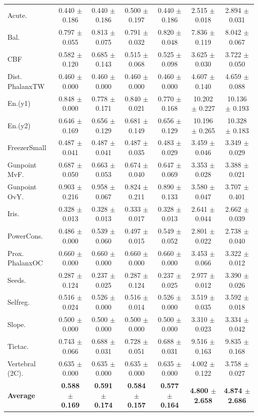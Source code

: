 \begin{table}[t]
{\begin{tabular}{lcccccc}
Acute. & 0.440 $\pm$ 0.186 & 0.440 $\pm$ 0.186 & 0.500 $\pm$ 0.197 & 0.440 $\pm$ 0.186 & 2.515 $\pm$ 0.018 & 2.894 $\pm$ 0.031 \\
Bal. & 0.797 $\pm$ 0.055 & 0.813 $\pm$ 0.075 & 0.791 $\pm$ 0.032 & 0.820 $\pm$ 0.048 & 7.836 $\pm$ 0.119 & 8.042 $\pm$ 0.067 \\
CBF & 0.582 $\pm$ 0.120 & 0.685 $\pm$ 0.143 & 0.515 $\pm$ 0.068 & 0.525 $\pm$ 0.098 & 3.625 $\pm$ 0.030 & 3.722 $\pm$ 0.050 \\
Dist. PhalanxTW & 0.460 $\pm$ 0.000 & 0.460 $\pm$ 0.000 & 0.460 $\pm$ 0.000 & 0.460 $\pm$ 0.000 & 4.607 $\pm$ 0.140 & 4.659 $\pm$ 0.088 \\
En.(y1) & 0.848 $\pm$ 0.000 & 0.778 $\pm$ 0.171 & 0.840 $\pm$ 0.021 & 0.770 $\pm$ 0.168 & 10.202 $\pm$ 0.227 & 10.136 $\pm$ 0.193 \\
En.(y2) & 0.646 $\pm$ 0.169 & 0.656 $\pm$ 0.129 & 0.681 $\pm$ 0.149 & 0.656 $\pm$ 0.129 & 10.196 $\pm$ 0.265 & 10.328 $\pm$ 0.183 \\
FreezerSmall & 0.487 $\pm$ 0.041 & 0.487 $\pm$ 0.041 & 0.487 $\pm$ 0.035 & 0.483 $\pm$ 0.029 & 3.459 $\pm$ 0.046 & 3.349 $\pm$ 0.029 \\
Gunpoint MvF. & 0.687 $\pm$ 0.050 & 0.663 $\pm$ 0.053 & 0.674 $\pm$ 0.040 & 0.647 $\pm$ 0.069 & 3.353 $\pm$ 0.028 & 3.388 $\pm$ 0.021 \\
Gunpoint OvY. & 0.903 $\pm$ 0.216 & 0.958 $\pm$ 0.067 & 0.824 $\pm$ 0.211 & 0.890 $\pm$ 0.133 & 3.580 $\pm$ 0.047 & 3.707 $\pm$ 0.401 \\
Iris. & 0.328 $\pm$ 0.013 & 0.328 $\pm$ 0.013 & 0.333 $\pm$ 0.017 & 0.328 $\pm$ 0.013 & 2.641 $\pm$ 0.044 & 2.662 $\pm$ 0.039 \\
PowerCons. & 0.486 $\pm$ 0.000 & 0.539 $\pm$ 0.060 & 0.497 $\pm$ 0.015 & 0.549 $\pm$ 0.052 & 2.801 $\pm$ 0.022 & 2.738 $\pm$ 0.040 \\
Prox. PhalanxOC & 0.660 $\pm$ 0.000 & 0.660 $\pm$ 0.000 & 0.660 $\pm$ 0.000 & 0.660 $\pm$ 0.000 & 3.453 $\pm$ 0.066 & 3.322 $\pm$ 0.012 \\
Seeds. & 0.287 $\pm$ 0.124 & 0.237 $\pm$ 0.025 & 0.287 $\pm$ 0.124 & 0.237 $\pm$ 0.025 & 2.977 $\pm$ 0.012 & 3.390 $\pm$ 0.026 \\
Selfreg. & 0.516 $\pm$ 0.024 & 0.526 $\pm$ 0.000 & 0.516 $\pm$ 0.014 & 0.526 $\pm$ 0.000 & 3.519 $\pm$ 0.035 & 3.592 $\pm$ 0.018 \\
Slope. & 0.500 $\pm$ 0.000 & 0.500 $\pm$ 0.000 & 0.500 $\pm$ 0.000 & 0.500 $\pm$ 0.000 & 3.310 $\pm$ 0.023 & 3.334 $\pm$ 0.042 \\
Tictac. & 0.743 $\pm$ 0.066 & 0.688 $\pm$ 0.031 & 0.728 $\pm$ 0.051 & 0.688 $\pm$ 0.031 & 9.516 $\pm$ 0.163 & 9.835 $\pm$ 0.168 \\
Vertebral (2C). & 0.635 $\pm$ 0.000 & 0.635 $\pm$ 0.000 & 0.635 $\pm$ 0.000 & 0.635 $\pm$ 0.000 & 4.002 $\pm$ 0.122 & 3.758 $\pm$ 0.027 \\
\midrule
\textbf{Average} & \textbf{0.588 $\pm$ 0.169} & \textbf{0.591 $\pm$ 0.174} & \textbf{0.584 $\pm$ 0.157} & \textbf{0.577 $\pm$ 0.164} & \textbf{4.800 $\pm$ 2.658} & \textbf{4.874 $\pm$ 2.686} \\
\bottomrule
\end{tabular}%
}
\end{table}
